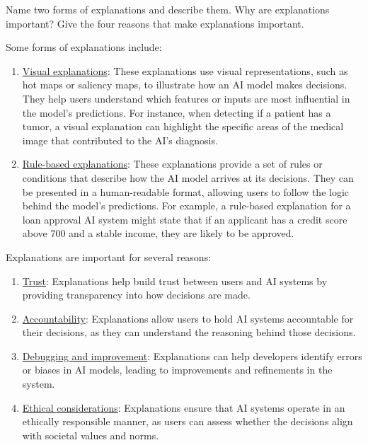 \begin{ejercicio}
    Name two forms of explanations and describe them. Why are explanations important? Give the four reasons that make explanations important.

    Some forms of explanations include:
    \begin{enumerate}
        \item \ul{Visual explanations}: These explanations use visual representations, such as hot maps or saliency maps, to illustrate how an AI model makes decisions. They help users understand which features or inputs are most influential in the model's predictions. For instance, when detecting if a patient has a tumor, a visual explanation can highlight the specific areas of the medical image that contributed to the AI's diagnosis.
        \item \ul{Rule-based explanations}: These explanations provide a set of rules or conditions that describe how the AI model arrives at its decisions. They can be presented in a human-readable format, allowing users to follow the logic behind the model's predictions. For example, a rule-based explanation for a loan approval AI system might state that if an applicant has a credit score above 700 and a stable income, they are likely to be approved.
    \end{enumerate}

    Explanations are important for several reasons:
    \begin{enumerate}
        \item \ul{Trust}: Explanations help build trust between users and AI systems by providing transparency into how decisions are made.
        \item \ul{Accountability}: Explanations allow users to hold AI systems accountable for their decisions, as they can understand the reasoning behind those decisions.
        \item \ul{Debugging and improvement}: Explanations can help developers identify errors or biases in AI models, leading to improvements and refinements in the system.
        \item \ul{Ethical considerations}: Explanations ensure that AI systems operate in an ethically responsible manner, as users can assess whether the decisions align with societal values and norms.
    \end{enumerate}
\end{ejercicio}

